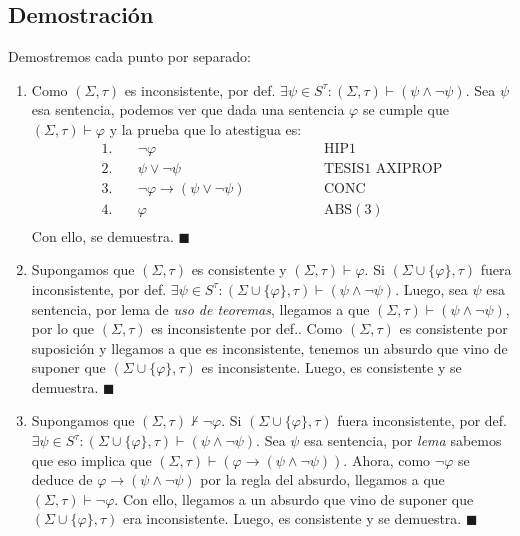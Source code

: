 \documentclass{article}
\begin{document}
\subsection*{Demostración}
Demostremos cada punto por separado:
\begin{enumerate}
  \item Como $(\Sigma,\tau)$ es inconsistente, por def. $\exists\psi\in S^\tau:(\Sigma,\tau)\vdash(\psi\land\neg\psi)$. Sea $\psi$ esa sentencia, podemos ver que dada una sentencia $\varphi$ se cumple que $(\Sigma,\tau)\vdash\varphi$ y la prueba que lo atestigua es:
        \begin{equation*}
          \begin{alignedat}{2}
            1.\quad & \neg\varphi                      &  & \qquad\qquad\text{HIP1}           \\
            2.\quad & \psi\lor\neg\psi                 &  & \qquad\qquad\text{TESIS1 AXIPROP} \\
            3.\quad & \neg\varphi\to(\psi\lor\neg\psi) &  & \qquad\qquad\text{CONC}           \\
            4.\quad & \varphi                          &  & \qquad\qquad\text{ABS}(3)         \\
          \end{alignedat}
        \end{equation*}
        Con ello, se demuestra. $\blacksquare$
  \item Supongamos que $(\Sigma,\tau)$ es consistente y $(\Sigma,\tau)\vdash\varphi$. Si $(\Sigma\cup\{\varphi\},\tau)$ fuera inconsistente, por def. $\exists\psi\in S^\tau:(\Sigma\cup\{\varphi\},\tau)\vdash(\psi\land\neg\psi)$. Luego, sea $\psi$ esa sentencia, por lema de \textit{uso de teoremas}, llegamos a que $(\Sigma,\tau)\vdash(\psi\land\neg\psi)$, por lo que $(\Sigma,\tau)$ es inconsistente por def.. Como $(\Sigma,\tau)$ es consistente por suposición y llegamos a que es inconsistente, tenemos un absurdo que vino de suponer que $(\Sigma\cup\{\varphi\},\tau)$ es inconsistente. Luego, es consistente y se demuestra. $\blacksquare$
  \item Supongamos que $(\Sigma,\tau)\nvdash\neg\varphi$. Si $(\Sigma\cup\{\varphi\},\tau)$ fuera inconsistente, por def. $\exists\psi\in S^\tau:(\Sigma\cup\{\varphi\},\tau)\vdash(\psi\land\neg\psi)$. Sea $\psi$ esa sentencia, por \textit{lema} sabemos que eso implica que $(\Sigma,\tau)\vdash(\varphi\to(\psi\land\neg\psi))$. Ahora, como $\neg\varphi$ se deduce de $\varphi\to(\psi\land\neg\psi)$ por la regla del absurdo, llegamos a que $(\Sigma,\tau)\vdash\neg\varphi$. Con ello, llegamos a un absurdo que vino de suponer que $(\Sigma\cup\{\varphi\},\tau)$ era inconsistente. Luego, es consistente y se demuestra. $\blacksquare$
\end{enumerate}
\end{document}
